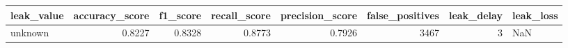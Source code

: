 \begin{tabular}{lrrrrrrl}
\toprule
leak\_value & accuracy\_score & f1\_score & recall\_score & precision\_score & false\_positives & leak\_delay & leak\_loss \\
\midrule
unknown & 0.8227 & 0.8328 & 0.8773 & 0.7926 & 3467 & 3 & NaN \\
\bottomrule
\end{tabular}
